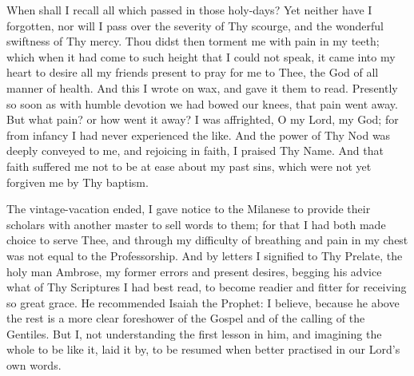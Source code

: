 \documentclass[b5paper,openright,12pt,twoside]{book}
\begin{document}
When shall I recall all which passed in those holy-days? Yet neither
have I forgotten, nor will I pass over the severity of Thy scourge, and
the wonderful swiftness of Thy mercy. Thou didst then torment me with
pain in my teeth; which when it had come to such height that I could not
speak, it came into my heart to desire all my friends present to pray
for me to Thee, the God of all manner of health. And this I wrote on
wax, and gave it them to read. Presently so soon as with humble devotion
we had bowed our knees, that pain went away. But what pain? or how went
it away? I was affrighted, O my Lord, my God; for from infancy I had
never experienced the like. And the power of Thy Nod was deeply conveyed
to me, and rejoicing in faith, I praised Thy Name. And that faith
suffered me not to be at ease about my past sins, which were not yet
forgiven me by Thy baptism.

The vintage-vacation ended, I gave notice to the Milanese to provide
their scholars with another master to sell words to them; for that I had
both made choice to serve Thee, and through my difficulty of breathing
and pain in my chest was not equal to the Professorship. And by letters
I signified to Thy Prelate, the holy man Ambrose, my former errors and
present desires, begging his advice what of Thy Scriptures I had best
read, to become readier and fitter for receiving so great grace. He
recommended Isaiah the Prophet: I believe, because he above the rest
is a more clear foreshower of the Gospel and of the calling of the
Gentiles. But I, not understanding the first lesson in him, and
imagining the whole to be like it, laid it by, to be resumed when better
practised in our Lord's own words.
\end{document}
